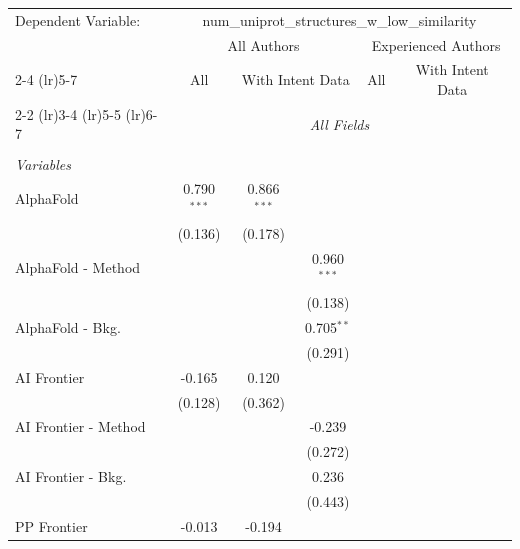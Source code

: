 \begingroup
\centering
\begin{tabular}{lcccccc}
   \tabularnewline \midrule \midrule
   Dependent Variable: & \multicolumn{6}{c}{num\_uniprot\_structures\_w\_low\_similarity}\\
 & \multicolumn{3}{c}{All Authors} & \multicolumn{3}{c}{Experienced Authors} \\
\cmidrule(lr){2-4} \cmidrule(lr){5-7}
 & \multicolumn{1}{c}{All} & \multicolumn{2}{c}{With Intent Data} & \multicolumn{1}{c}{All} & \multicolumn{2}{c}{With Intent Data} \\
\cmidrule(lr){2-2} \cmidrule(lr){3-4} \cmidrule(lr){5-5} \cmidrule(lr){6-7}
 & \multicolumn{6}{c}{\textit{All Fields}} \\ \\
   \emph{Variables}\\
   AlphaFold            & 0.790$^{***}$ & 0.866$^{***}$ &               &        &        &   \\   
                        & (0.136)       & (0.178)       &               &        &        &   \\   
   AlphaFold - Method   &               &               & 0.960$^{***}$ &        &        &   \\   
                        &               &               & (0.138)       &        &        &   \\   
   AlphaFold - Bkg.     &               &               & 0.705$^{**}$  &        &        &   \\   
                        &               &               & (0.291)       &        &        &   \\   
   AI Frontier          & -0.165        & 0.120         &               &        &        &   \\   
                        & (0.128)       & (0.362)       &               &        &        &   \\   
   AI Frontier - Method &               &               & -0.239        &        &        &   \\   
                        &               &               & (0.272)       &        &        &   \\   
   AI Frontier - Bkg.   &               &               & 0.236         &        &        &   \\   
                        &               &               & (0.443)       &        &        &   \\   
   PP Frontier          & -0.013        & -0.194        &               &        &        &   \\   

\end{tabular}
